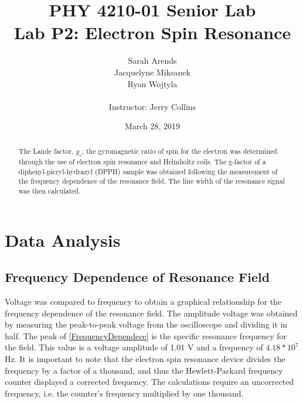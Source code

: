 \documentclass[a4paper]{article}
\title{PHY 4210-01 Senior Lab \\Lab P2: Electron Spin Resonance}
\author{Sarah Arends \\ 
        Jacquelyne Miksanek \\
        Ryan Wojtyla \\ \\
        Instructor: Jerry Collins}
\date{March 28, 2019}
\begin{document}
\maketitle 

\begin{abstract}

\qq The Lande factor, $g_s$, the gyromagnetic ratio of spin for the
electron was determined through the use of electron spin resonance and
Helmholtz coils. The g-factor of a diphenyl-picryl-hydrazyl (DPPH) sample was
obtained following the measurement of the frequency dependence of the
resonance field. The line width of the resonance signal was then calculated.

\end{abstract}

\newpage

\tableofcontents

\newpage

\section{Data Analysis}
\subsection{Frequency Dependence of Resonance Field}

\qq Voltage was compared to frequency to obtain a graphical
relationship for the frequency dependence of the resonance field. The
amplitude voltage was obtained by measuring the peak-to-peak voltage
from the oscilloscope and dividing it in half. The peak of
\ref{FrequencyDependece} is the specific resonance frequency for the
field. This value is a voltage amplitude of 1.01 V and a frequency of $4.18*10^7$ Hz. It is important to note that the electron spin resonance device
divides the frequency by a factor of a thousand, and thus the
Hewlett-Packard frequency counter displayed a corrected frequency. The
calculations require an uncorrected frequency, i.e. the counter's
frequency multiplied by one thousand.
\end{document}
